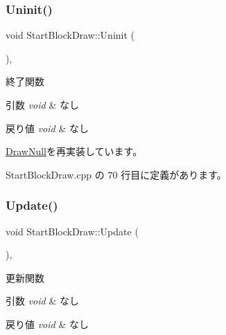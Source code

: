 \subsubsection{\texorpdfstring{Uninit()}{Uninit()}}
{\footnotesize\ttfamily void Start\+Block\+Draw\+::\+Uninit (\begin{DoxyParamCaption}{ }\end{DoxyParamCaption})\hspace{0.3cm}{\ttfamily [override]}, {\ttfamily [virtual]}}



終了関数 


\begin{DoxyParams}{引数}
{\em void} & なし \\
\hline
\end{DoxyParams}

\begin{DoxyRetVals}{戻り値}
{\em void} & なし \\
\hline
\end{DoxyRetVals}


\mbox{\hyperlink{class_draw_null_a6e81d63efab7333e8d0e8af99362a4d9}{Draw\+Null}}を再実装しています。



 Start\+Block\+Draw.\+cpp の 70 行目に定義があります。

\mbox{\label{class_start_block_draw_a845ce671ce8191a68ef4fc159c2f2a93}} 
\subsubsection{\texorpdfstring{Update()}{Update()}}
{\footnotesize\ttfamily void Start\+Block\+Draw\+::\+Update (\begin{DoxyParamCaption}{ }\end{DoxyParamCaption})\hspace{0.3cm}{\ttfamily [override]}, {\ttfamily [virtual]}}



更新関数 


\begin{DoxyParams}{引数}
{\em void} & なし \\
\hline
\end{DoxyParams}

\begin{DoxyRetVals}{戻り値}
{\em void} & なし \\
\hline
\end{DoxyRetVals}


